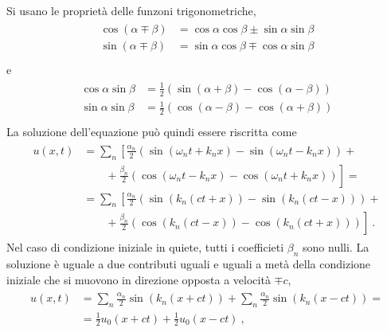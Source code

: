 \documentclass[letterpaper,10pt,italian]{jupyterBook}
\begin{document}
\sphinxAtStartPar
Si usano le proprietà delle funzoni trigonometriche,
\begin{equation*}
\begin{split}\begin{aligned}
 \cos(\alpha \mp \beta) & = \cos \alpha \cos \beta \pm \sin \alpha \sin \beta \\
 \sin(\alpha \mp \beta) & = \sin \alpha \cos \beta \mp \cos \alpha \sin \beta \\
\end{aligned}\end{split}
\end{equation*}
\sphinxAtStartPar
e
\begin{equation*}
\begin{split}\begin{aligned}
 \cos \alpha \sin \beta & = \frac{1}{2} \left( \sin(\alpha+\beta) - \cos(\alpha-\beta) \right) \\
 \sin \alpha \sin \beta & = \frac{1}{2} \left( \cos(\alpha-\beta) - \cos(\alpha+\beta) \right) \\
\end{aligned}\end{split}
\end{equation*}
\sphinxAtStartPar
La soluzione dell’equazione può quindi essere riscritta come
\begin{equation*}
\begin{split}\begin{aligned}
 u(x,t)
 & = \sum_n \left[\frac{\alpha_n}{2}\left( \sin(\omega_n t + k_n x) - \sin(\omega_n t - k_n x)  \right) \right. + \\
 & \qquad + \left.\frac{\beta_n }{2}\left( \cos(\omega_n t - k_n x) - \cos(\omega_n t + k_n x)  \right) \right] = \\ 
 & = \sum_n \left[\frac{\alpha_n}{2}\left( \sin(k_n (c t + x)) - \sin(k_n(c t - x))  \right) \right. + \\
 & \qquad + \left.\frac{\beta_n }{2}\left( \cos(k_n (c t - x)) - \cos(k_n(c t + x))  \right) \right] \ .
\end{aligned}\end{split}
\end{equation*}
\sphinxAtStartPar
Nel caso di condizione iniziale in quiete, tutti i coefficieti \(\beta_n\) sono nulli. La soluzione è uguale a due contributi uguali \sphinxhyphen{} e uguali a metà della condizione iniziale \sphinxhyphen{} che si muovono in direzione opposta a velocità \(\mp c\),
\begin{equation*}
\begin{split}\begin{aligned}
  u(x,t) 
  & = \sum_n \frac{\alpha_n}{2} \sin(k_n(x+ct)) + \sum_n \frac{\alpha_n}{2} \sin(k_n(x-ct)) = \\
  & = \frac{1}{2} u_0(x+ct) + \frac{1}{2} u_0(x-ct) \ ,
\end{aligned}\end{split}
\end{equation*}
\end{document}
